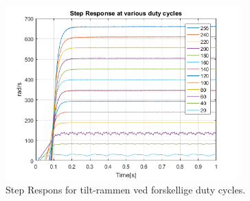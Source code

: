 \begin{figure}[!ht]
	\begin{center}
		\includegraphics[width=0.8\textwidth]{Billeder/RPM_vs_DC.png}
	\end{center}
	\caption{Step Respons for tilt-rammen ved forskellige duty cycles.}
	\label{fig:RPM_DC}
\end{figure}